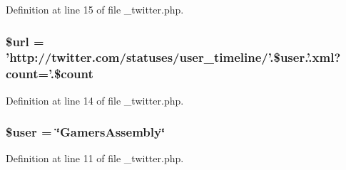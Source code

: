 Definition at line 15 of file \-\_\-twitter.\-php.

\hypertarget{live_2modules_2main_2templates_2__twitter_8php_acf215f34a917d014776ce684a9ee8909}{
\subsubsection[{\$url}]{\setlength{\rightskip}{0pt plus 5cm}\$url = 'http\-://twitter.\-com/statuses/user\-\_\-timeline/'.\$user.'.xml?count='.\$count}}\label{live_2modules_2main_2templates_2__twitter_8php_acf215f34a917d014776ce684a9ee8909}


Definition at line 14 of file \-\_\-twitter.\-php.

\hypertarget{live_2modules_2main_2templates_2__twitter_8php_a598ca4e71b15a1313ec95f0df1027ca5}{
\subsubsection[{\$user}]{\setlength{\rightskip}{0pt plus 5cm}\$user = \char`\"{}Gamers\-Assembly\char`\"{}}}\label{live_2modules_2main_2templates_2__twitter_8php_a598ca4e71b15a1313ec95f0df1027ca5}


Definition at line 11 of file \-\_\-twitter.\-php.

